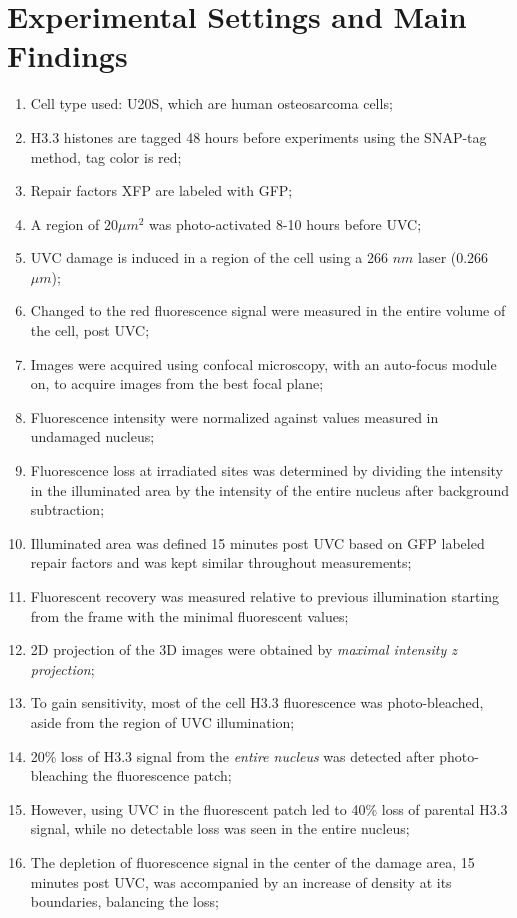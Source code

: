 \documentclass[12pt]{report}
\begin{document}
	\section{Experimental Settings and Main Findings}
	\begin{enumerate}
		\itemsep0em
		\item Cell type used: U20S, which are human osteosarcoma cells;
		\item H3.3 histones are tagged 48 hours before experiments using the SNAP-tag method, tag color is red;
		\item Repair factors XFP are labeled with GFP;
		\item A region of $20 \mu m^2$ was photo-activated 8-10 hours before UVC;
		\item UVC damage is induced in a region of the cell using a 266 $nm$ laser (0.266 $\mu m$);
		\item Changed to the red fluorescence signal were measured in the entire volume of the cell, post UVC;
		\item Images were acquired using confocal microscopy, with an auto-focus module on, to acquire images from the best focal plane;
		\item Fluorescence intensity were normalized against values measured in undamaged nucleus;
		\item Fluorescence loss at irradiated sites was determined by dividing the intensity in the illuminated area by the intensity of the entire nucleus after background subtraction;
		\item Illuminated area was defined 15 minutes post UVC based on GFP labeled repair factors and was kept similar throughout measurements;
		\item Fluorescent recovery was measured relative to previous illumination starting from the frame with the minimal fluorescent values;
		\item 2D projection of the 3D images were obtained by \textit{maximal intensity z projection};
		\item To gain sensitivity, most of the cell H3.3 fluorescence was photo-bleached, aside from the region of UVC illumination;
		\item 20\% loss of H3.3 signal from the \textit{entire nucleus} was detected after photo-bleaching the fluorescence patch;
		\item However, using UVC in the fluorescent patch led to 40\% loss of parental H3.3 signal, while no detectable loss was seen in the entire nucleus;
		\item The depletion of fluorescence signal in the center of the damage area, 15 minutes post UVC, was accompanied by an increase of density at its boundaries, balancing the loss;

\end{enumerate}
\end{document}
